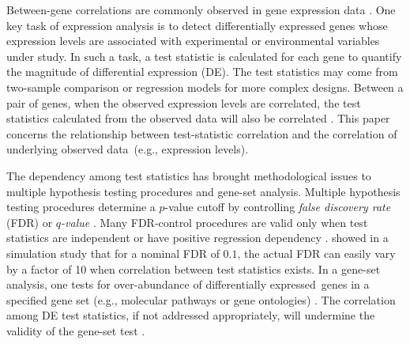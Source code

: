\documentclass[12pt, a4paper]{article}
\newcommand{\popucor}{the correlation of underlying observed data}
\newcommand{\DED}{differentially expressed}
\begin{document}
Between-gene correlations are commonly observed in gene expression 
data \citep{efron2012large1, gatti2010heading, 
	huang2013gene,qiu2005effects,storey2003positive}.
One key task of expression analysis is to detect differentially expressed genes whose 
expression levels are associated with experimental or environmental variables under study. 
In such a task, a test statistic is calculated for each gene to quantify the magnitude of 
differential expression (DE). 
The test statistics may come from two-sample comparison or regression models for more complex 
designs. Between a pair of genes, when the observed expression levels are correlated, the test 
statistics calculated from the observed data will also be correlated 
\citep{barry2008statistical, efron2007correlation, wu2012camera}. This paper concerns the 
relationship between test-statistic correlation and \popucor~(e.g., expression levels).

The dependency among test statistics has brought methodological issues to multiple hypothesis 
testing procedures and gene-set analysis. 
Multiple hypothesis testing procedures determine a $p$-value cutoff by controlling 
\textit{false discovery rate} (FDR) 
\citep{benjamini1995controlling} or 
\textit{$q$-value} \citep{storey2003positive}. 
Many FDR-control procedures are valid only 
when test statistics are independent \citep{benjamini1995controlling} or 
have positive regression dependency \citep{benjamini2001control}. 
\citet{efron2007correlation} showed in a simulation study that for a nominal FDR of 
$0.1$, the actual FDR can easily vary by a factor of 10 when correlation between test 
statistics exists. 
In a gene-set analysis, one tests for over-abundance of \DED~genes in a
specified gene set (e.g., molecular pathways or gene ontologies) \citep{goeman2007analyzing}. 
The correlation among DE test statistics, if not addressed appropriately, will undermine 
the validity of the gene-set test \citep{gatti2010heading, wu2012camera}. 
\end{document}
